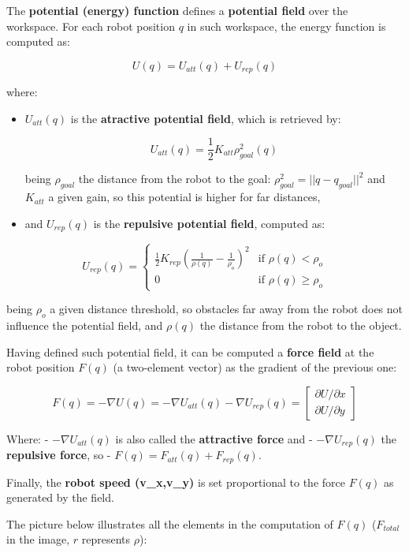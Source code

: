 \documentclass[11pt]{article}
\begin{document}
The \textbf{potential (energy) function} defines a \textbf{potential
field} over the workspace. For each robot position \(q\) in such
workspace, the energy function is computed as:

\[U(q)=U_{att}(q)+U_{rep}(q)\]

where:

\begin{itemize}
\item
  \(U_{att}(q)\) is the \textbf{atractive potential field}, which is
  retrieved by:

  \[U_{att}(q)=\frac{1}{2}K_{att}\rho^2_{goal}(q)\]

  being \(\rho_{goal}\) the distance from the robot to the goal:
  \(\rho^2_{goal}=||q-q_{goal}||^2\) and \(K_{att}\) a given gain, so
  this potential is higher for far distances,
\item
  and \(U_{rep}(q)\) is the \textbf{repulsive potential field}, computed
  as:
\end{itemize}

\[U_{rep}(q)=  \begin{cases} 
   \frac{1}{2} K_{rep}(\frac{1}{\rho(q)}-\frac{1}{\rho_o})^2 & \text{if } \rho(q) < \rho_o \\
   0       & \text{if } \rho(q) \geq \rho_o
  \end{cases}\]

being \(\rho_o\) a given distance threshold, so obstacles far away from
the robot does not influence the potential field, and \(\rho(q)\) the
distance from the robot to the object.

Having defined such potential field, it can be computed a \textbf{force
field} at the robot position \(F(q)\) (a two-element vector) as the
gradient of the previous one:

\[
F(q) = -\nabla U(q) = -\nabla U_{att}(q) - \nabla U_{rep}(q) = \begin{bmatrix} \partial U / \partial x \\ \partial U / \partial y \end{bmatrix}
\]

Where: - \(-\nabla U_{att}(q)\) is also called the \textbf{attractive
force} and - \(-\nabla U_{rep}(q)\) the \textbf{repulsive force}, so -
\(F(q)=F_{att}(q)+F_{rep}(q)\).

Finally, the \textbf{robot speed (v\_x,v\_y)} is set proportional to the
force \(F(q)\) as generated by the field.

The picture below illustrates all the elements in the computation of
\(F(q)\) (\(F_{total}\) in the image, \(r\) represents \(\rho\)):
\end{document}
